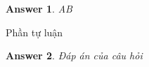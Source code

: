 \documentclass[12pt,a4paper,notitlepage]{article}
\newtheorem{answer}{Answer}
\begin{document}
    \begin{answer}
        AB
    \end{answer}

    Phần tự luận



    \begin{answer}
        Đáp án của câu hỏi
    \end{answer}
\end{document}
